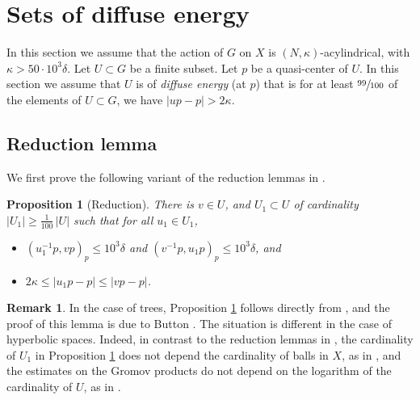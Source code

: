 \documentclass[JEP,XML,SOM,Unicode, NoEqCountersInSection,published]{cedram}
\theoremstyle{plain}
\newtheorem{prop}[thm]{Proposition}
\theoremstyle{definition}
\newtheorem{rem}[thm]{Remark}
\begin{document}
\section{Sets of diffuse energy}
In this section we assume that the action of $G$ on $X$ is $(N, \kappa)$-acylindrical, with $\kappa > 50\cdot 10^3\delta$.
Let $U \subset G$ be a finite subset.
Let $p$ be a quasi-center of $U$.
In this section we assume that $U$ is of \emph{diffuse energy} (at $p$) that is for at least $\sfrac{99}{100}$ of the elements of $U\subset G$, we have $ |up-p|> 2\kappa$.

\subsection{Reduction lemma}

We first prove the following variant of the reduction lemmas in \cite{delzant_product_2020}.

\begin{prop}[Reduction]\label{L: reduction}
There is $v\in U$, and $U_1\subset U$ of cardinality $|U_1|\geqslant \frac{1}{100}\, |U|$ such that for all $u_1\in U_1$,
\begin{itemize}
\item $(u_1^{-1}p,vp)_p\leqslant 10^3 \delta$ and $(v^{-1}p,u_1p)_p\leqslant 10^3 \delta$, and
\item $2\kappa \leqslant |u_1p-p|\leqslant |vp-p|$.
\end{itemize}
\end{prop}

\begin{rem} In the case of trees, Proposition \ref{L: reduction} follows directly from \cite[Lem.\,6.4]{delzant_product_2020}, and the proof of this lemma is due to Button \cite{button_explicit_2013}. The situation is different in the case of hyperbolic spaces. Indeed, in contrast to the reduction lemmas in \cite[\S 6.1]{delzant_product_2020}, the cardinality of $U_1$ in Proposition \ref{L: reduction} does not depend the cardinality of balls in $X$, as in \cite[Lem.\,6.3]{delzant_product_2020}, and the estimates on the Gromov products do not depend on the logarithm of the cardinality of $U$, as in \cite[Lem.\,6.8]{delzant_product_2020}.
\end{rem}
\end{document}
